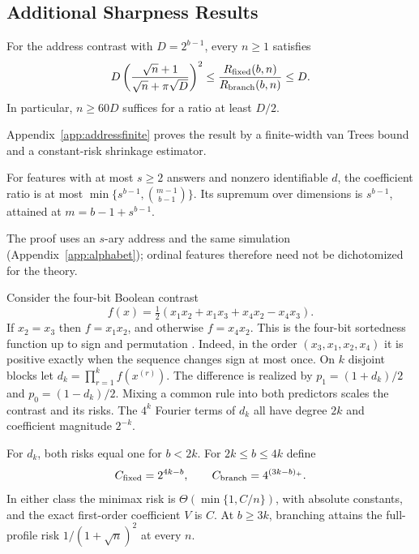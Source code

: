 \subsection{Additional Sharpness Results}
\begin{proposition}\label{prop:finiteaddress}
For the address contrast with $D=2^{b-1}$, every $n\ge1$ satisfies
\[
 D\left(\frac{\sqrt n+1}{\sqrt n+\pi\sqrt D}\right)^2
 \le\frac{R_{\rm fixed}(b,n)}{R_{\rm branch}(b,n)}\le D.
\]
In particular, $n\ge60D$ suffices for a ratio at least $D/2$.
\end{proposition}
Appendix~\ref{app:addressfinite} proves the result by a finite-width van Trees bound and a constant-risk shrinkage estimator.

\begin{corollary}\label{cor:alphabet}
For features with at most $s\ge2$ answers and nonzero identifiable $d$, the coefficient ratio is at most $\min\{s^{b-1},\binom{m-1}{b-1}\}$. Its supremum over dimensions is $s^{b-1}$, attained at $m=b-1+s^{b-1}$.
\end{corollary}
The proof uses an $s$-ary address and the same simulation (Appendix~\ref{app:alphabet}); ordinal features therefore need not be dichotomized for the theory.


Consider the four-bit Boolean contrast
\begin{equation}
 f(x)=\tfrac12(x_1x_2+x_1x_3+x_4x_2-x_4x_3).
 \label{eq:block}
\end{equation}
If $x_2=x_3$ then $f=x_1x_2$, and otherwise $f=x_4x_2$. This is the four-bit sortedness function up to sign and permutation \citep[Chapter~1]{odonnell2014}. Indeed, in the order $(x_3,x_1,x_2,x_4)$ it is positive exactly when the sequence changes sign at most once. On $k$ disjoint blocks let $d_k=\prod_{r=1}^k f(x^{(r)})$. The difference is realized by $p_1=(1+d_k)/2$ and $p_0=(1-d_k)/2$. Mixing a common rule into both predictors scales the contrast and its risks. The $4^k$ Fourier terms of $d_k$ all have degree $2k$ and coefficient magnitude $2^{-k}$.

\begin{theorem}\label{thm:gap}
For $d_k$, both risks equal one for $b<2k$. For $2k\le b\le4k$ define
\[
 C_{\rm fixed}=2^{4k-b},\qquad
 C_{\rm branch}=4^{(3k-b)_+}.
\]
In either class the minimax risk is $\Theta(\min\{1,C/n\})$, with absolute constants, and the exact first-order coefficient $V$ is $C$. At $b\ge3k$, branching attains the full-profile risk $1/(1+\sqrt n)^2$ at every $n$.
\end{theorem}

